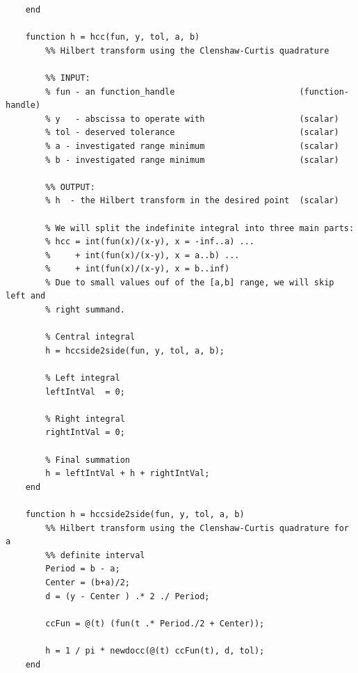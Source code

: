 \documentclass[12pt,twoside,a4paper]{article}
\numberwithin{equation}{subsection}
\numberwithin{figure}{subsection}
\begin{document}
\begin{lstlisting}
	end
	
	function h = hcc(fun, y, tol, a, b)
	    %% Hilbert transform using the Clenshaw-Curtis quadrature
	    
	    %% INPUT:
	    % fun - an function_handle                         (function-handle) 
	    % y   - abscissa to operate with                   (scalar)
	    % tol - deserved tolerance                         (scalar)
	    % a - investigated range minimum                   (scalar)
	    % b - investigated range minimum                   (scalar)
	    
	    %% OUTPUT:
	    % h  - the Hilbert transform in the desired point  (scalar)
	    
	    % We will split the indefinite integral into three main parts:
	    % hcc = int(fun(x)/(x-y), x = -inf..a) ...
	    %     + int(fun(x)/(x-y), x = a..b) ...
	    %     + int(fun(x)/(x-y), x = b..inf)
	    % Due to small values ouf of the [a,b] range, we will skip left and
	    % right summand.
	    
	    % Central integral
	    h = hccside2side(fun, y, tol, a, b);
	    
	    % Left integral
	    leftIntVal  = 0;
	    
	    % Right integral
	    rightIntVal = 0;
	    
	    % Final summation
	    h = leftIntVal + h + rightIntVal;
	end
	
	function h = hccside2side(fun, y, tol, a, b)
	    %% Hilbert transform using the Clenshaw-Curtis quadrature for a
	    %% definite interval
	    Period = b - a;
	    Center = (b+a)/2;
	    d = (y - Center ) .* 2 ./ Period;
	   
	    ccFun = @(t) (fun(t .* Period./2 + Center));
	    
	    h = 1 / pi * newdocc(@(t) ccFun(t), d, tol);
	end
\end{lstlisting}
\end{document}
